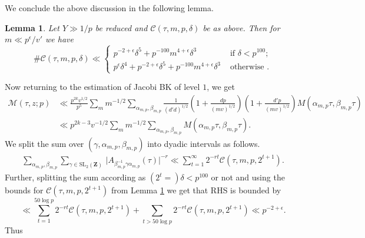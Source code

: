 \documentclass[11pt]{amsart}
\numberwithin{equation}{section}
\theoremstyle{plain}
\newtheorem{lem}[thm]{Lemma}
\theoremstyle{definition}
\newcommand{\mf}{\mathbf}
\newcommand{\mc}{\mathcal}
\newcommand{\mrm}{\mathrm}
\newcommand{\sumn}{\sum \nolimits}
\newcommand{\sltwo}{\mrm{SL}_2(\mf Z)}
\begin{document}
We conclude the above discussion in the following lemma.
\begin{lem}\label{lem:countold}
    Let $Y\gg 1/p$ be reduced and $\mc C(\tau, m,p, \delta)$ be as above. Then for $m\ll p^\epsilon/v'$ we have
   \begin{equation}
    \# \mc C(\tau, m,p, \delta)\ll \begin{cases}
        p^{-2+\epsilon}\delta^5+p^{-100}m^{4+\epsilon}\delta^3  & \text{ if } \delta< p^{100};\\
        p^\epsilon \delta^4+ p^{-2+\epsilon}\delta^5+p^{-100}m^{4+\epsilon}\delta^3 & \text{ otherwise }.
    \end{cases}
\end{equation}
\end{lem}
Now returning to the estimation of Jacobi BK of level $1$, we get
\begin{align}
    \mc M(\tau,z;p)&\ll \frac{p^{2k}v^{1/2}}{p^5}\sum_m m^{-1/2}\sum_{\alpha_{m,p}, \beta_{m,p}} \frac{1}{(d'd)^{1/2}} \left(1+\frac{dp}{(mv)^{1/2}}\right)\left(1+\frac{d'p}{(mv)^{1/2}}\right)M(\alpha_{m,p}\tau,\beta_{m,p}\tau)\\
    &\ll p^{2k-3}v^{-1/2}\sumn_m m^{-1/2} \sumn_{\alpha_{m,p},\beta_{m,p}} M(\alpha_{m,p}\tau,\beta_{m,p}\tau).
\end{align}
We split the sum over $(\gamma, \alpha_{m,p}, \beta_{m,p})$ into dyadic intervals as follows.
\begin{equation}
\begin{split}
    \sum_{\alpha_{m,p}, \beta_{m,p}}\sum_{ \gamma\in \sltwo} \, \big |A_{\beta_{m,p}^{-1} \gamma \alpha_{m,p}}(\tau)|^{-r}\ll \sum_{t=1}^{\infty} 2^{-rt} \mc C(\tau, m,p, 2^{t+1}).
\end{split}
\end{equation}
Further, splitting the sum according as $(2^t=) \delta< p^{100}$ or not and using the bounds for $\mc C(\tau, m,p, 2^{t+1})$ from Lemma \ref{lem:countold} we get that RHS is bounded by
\begin{equation}
    \ll\sum_{t=1}^{50\log p} 2^{-rt} \mc C(\tau, m,p, 2^{t+1}) + \sum_{t> 50\log p} 2^{-rt} \mc C(\tau, m,p, 2^{t+1})\ll p^{-2+\epsilon}.
\end{equation}Thus 
\end{document}
